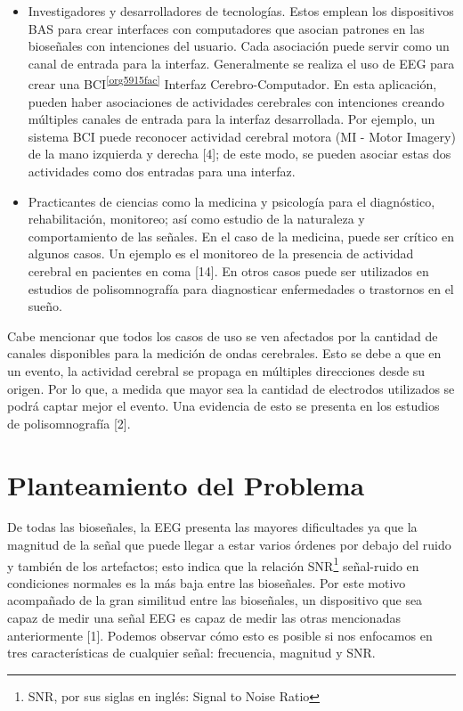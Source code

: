 \documentclass[11pt]{article}
\begin{document}
\begin{itemize}
\item Investigadores y desarrolladores de tecnologías. Estos emplean los dispositivos BAS para crear interfaces con computadores que asocian patrones en las bioseñales con intenciones del usuario. Cada asociación puede servir como un canal de entrada para la interfaz. Generalmente se realiza el uso de EEG para crear una BCI\textsuperscript{\ref{org5915fac}} Interfaz Cerebro-Computador. En esta aplicación, pueden haber asociaciones de actividades cerebrales con intenciones creando múltiples canales de entrada para la interfaz desarrollada. Por ejemplo, un sistema BCI puede reconocer actividad cerebral motora (MI - Motor Imagery) de la mano izquierda y derecha [4]; de este modo, se pueden asociar estas dos actividades como dos entradas para una interfaz.

\item Practicantes de ciencias como la medicina y psicología para el diagnóstico, rehabilitación, monitoreo; así como estudio de la naturaleza y comportamiento de las señales. En el caso de la medicina, puede ser crítico en algunos casos. Un ejemplo es el monitoreo de la presencia de actividad cerebral en pacientes en coma [14]. En otros casos puede ser utilizados en estudios de polisomnografía para diagnosticar enfermedades o trastornos en el sueño.
\end{itemize}

Cabe mencionar que todos los casos de uso se ven afectados por la cantidad de canales disponibles para la medición de ondas cerebrales. Esto se debe a que en un evento, la actividad cerebral se propaga en múltiples direcciones desde su origen. Por lo que, a medida que mayor sea la cantidad de electrodos utilizados se podrá captar mejor el evento. Una evidencia de esto se presenta en los estudios de polisomnografía [2].

\section{Planteamiento del Problema}
\label{sec:orga3f6dc3}
De todas las bioseñales, la EEG presenta las mayores dificultades ya que la magnitud de la señal que puede llegar a estar varios órdenes por debajo del ruido y también de los artefactos; esto indica que la relación SNR\footnote{SNR, por sus siglas en inglés: Signal to Noise Ratio} señal-ruido en condiciones normales es la más baja entre las bioseñales. Por este motivo acompañado de la gran similitud entre las bioseñales, un dispositivo que sea capaz de medir una señal EEG es capaz de medir las otras mencionadas anteriormente [1]. Podemos observar cómo esto es posible si nos enfocamos en tres características de cualquier señal: frecuencia, magnitud y SNR.
\end{document}
